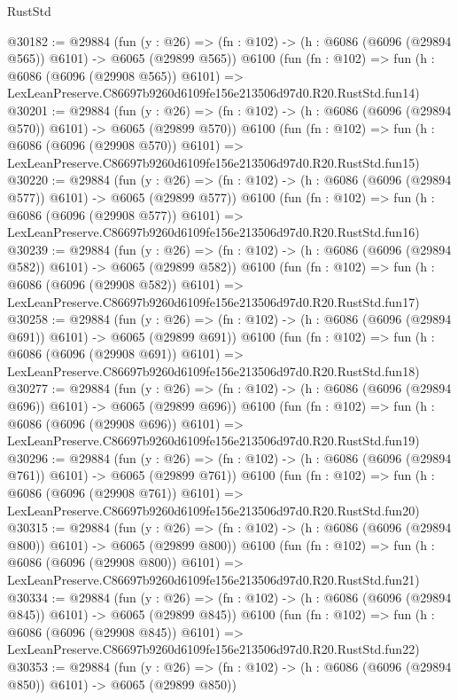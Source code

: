\begin{lexlean}{RustStd}
\begin{coremodule}
@30182 := @29884
    (fun (y : @26) => (fn : @102) -> (h : @6086 (@6096 (@29894 @565)) @6101) -> @6065 (@29899 @565))
    @6100
    (fun (fn : @102) =>
    fun (h : @6086 (@6096 (@29908 @565)) @6101) =>
    LexLeanPreserve.C86697b9260d6109fe156e213506d97d0.R20.RustStd.fun14)
@30201 := @29884
    (fun (y : @26) => (fn : @102) -> (h : @6086 (@6096 (@29894 @570)) @6101) -> @6065 (@29899 @570))
    @6100
    (fun (fn : @102) =>
    fun (h : @6086 (@6096 (@29908 @570)) @6101) =>
    LexLeanPreserve.C86697b9260d6109fe156e213506d97d0.R20.RustStd.fun15)
@30220 := @29884
    (fun (y : @26) => (fn : @102) -> (h : @6086 (@6096 (@29894 @577)) @6101) -> @6065 (@29899 @577))
    @6100
    (fun (fn : @102) =>
    fun (h : @6086 (@6096 (@29908 @577)) @6101) =>
    LexLeanPreserve.C86697b9260d6109fe156e213506d97d0.R20.RustStd.fun16)
@30239 := @29884
    (fun (y : @26) => (fn : @102) -> (h : @6086 (@6096 (@29894 @582)) @6101) -> @6065 (@29899 @582))
    @6100
    (fun (fn : @102) =>
    fun (h : @6086 (@6096 (@29908 @582)) @6101) =>
    LexLeanPreserve.C86697b9260d6109fe156e213506d97d0.R20.RustStd.fun17)
@30258 := @29884
    (fun (y : @26) => (fn : @102) -> (h : @6086 (@6096 (@29894 @691)) @6101) -> @6065 (@29899 @691))
    @6100
    (fun (fn : @102) =>
    fun (h : @6086 (@6096 (@29908 @691)) @6101) =>
    LexLeanPreserve.C86697b9260d6109fe156e213506d97d0.R20.RustStd.fun18)
@30277 := @29884
    (fun (y : @26) => (fn : @102) -> (h : @6086 (@6096 (@29894 @696)) @6101) -> @6065 (@29899 @696))
    @6100
    (fun (fn : @102) =>
    fun (h : @6086 (@6096 (@29908 @696)) @6101) =>
    LexLeanPreserve.C86697b9260d6109fe156e213506d97d0.R20.RustStd.fun19)
@30296 := @29884
    (fun (y : @26) => (fn : @102) -> (h : @6086 (@6096 (@29894 @761)) @6101) -> @6065 (@29899 @761))
    @6100
    (fun (fn : @102) =>
    fun (h : @6086 (@6096 (@29908 @761)) @6101) =>
    LexLeanPreserve.C86697b9260d6109fe156e213506d97d0.R20.RustStd.fun20)
@30315 := @29884
    (fun (y : @26) => (fn : @102) -> (h : @6086 (@6096 (@29894 @800)) @6101) -> @6065 (@29899 @800))
    @6100
    (fun (fn : @102) =>
    fun (h : @6086 (@6096 (@29908 @800)) @6101) =>
    LexLeanPreserve.C86697b9260d6109fe156e213506d97d0.R20.RustStd.fun21)
@30334 := @29884
    (fun (y : @26) => (fn : @102) -> (h : @6086 (@6096 (@29894 @845)) @6101) -> @6065 (@29899 @845))
    @6100
    (fun (fn : @102) =>
    fun (h : @6086 (@6096 (@29908 @845)) @6101) =>
    LexLeanPreserve.C86697b9260d6109fe156e213506d97d0.R20.RustStd.fun22)
@30353 := @29884
    (fun (y : @26) => (fn : @102) -> (h : @6086 (@6096 (@29894 @850)) @6101) -> @6065 (@29899 @850))

\end{coremodule}
\end{lexlean}
